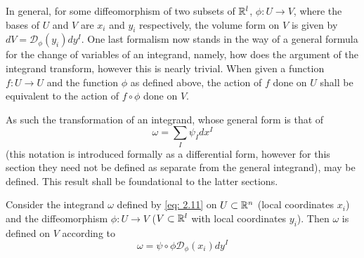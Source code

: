 \documentclass[.../main.tex]{subfiles}
\begin{document}
In general, for some diffeomorphism of two subsets of $\mathbb{R}^{l}$, $\phi: U \rightarrow V$, where the bases of $U$ and $V$ are $x_i$ and $y_i$ respectively, the volume form on $V$ is given by $dV = \mathcal{D}_{\phi} (y_i) dy^I$. One last formalism now stands in the way of a general formula for the change of variables of an integrand, namely, how does the argument of the integrand transform, however this is nearly trivial. When given a function $f: U \rightarrow U$ and the function $\phi$ as defined above, the action of $f$ done on $U$ shall be equivalent to the action of $f \circ \phi$ done on $V$.

As such the transformation of an integrand, whose general form is that of 
\begin{equation}
	\omega = \sum\limits_{I}\psi_Idx^I
	\label{eq: 2.11}
\end{equation}
(this notation is introduced formally as a differential form, however for this section they need not be defined as separate from the general integrand), may be defined. This result shall be foundational to the latter sections.

\begin{theorem}
	Consider the integrand $\omega$ defined by \ref{eq: 2.11} on $U \subset \mathbb{R}^{n}$ (local coordinates $x_i$) and the diffeomorphism $\phi : U \rightarrow V$ ($V \subset \mathbb{R}^{l}$ with local coordinates $y_i$). Then $\omega$ is defined on $V$ according to 
	\[
		\omega = \psi \circ \phi \mathcal{D}_{\phi}(x_i) dy^I
	\]
	\label{theorem: 2.2}
\end{theorem}

\setcounter{footnote}{5}
\end{document}
